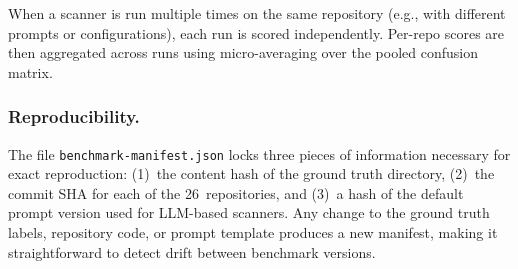 \noindent
When a scanner is run multiple times on the same repository (e.g., with different prompts or configurations), each run is scored independently.
Per-repo scores are then aggregated across runs using micro-averaging over the pooled confusion matrix.

\subsubsection{Reproducibility.}
The file \texttt{benchmark-manifest.json} locks three pieces of information necessary for exact reproduction: (1)~the content hash of the ground truth directory, (2)~the commit SHA for each of the 26~repositories, and (3)~a hash of the default prompt version used for LLM-based scanners.
Any change to the ground truth labels, repository code, or prompt template produces a new manifest, making it straightforward to detect drift between benchmark versions.
